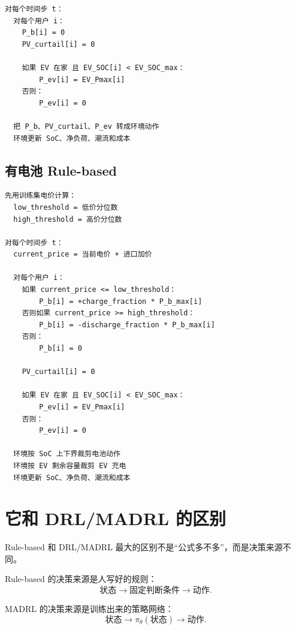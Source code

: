 \documentclass[UTF8,zihao=-4]{ctexart}
\begin{document}
\begin{lstlisting}[language={},caption={无电池 Rule-based 控制流程}]
对每个时间步 t：
  对每个用户 i：
    P_b[i] = 0
    PV_curtail[i] = 0

    如果 EV 在家 且 EV_SOC[i] < EV_SOC_max：
        P_ev[i] = EV_Pmax[i]
    否则：
        P_ev[i] = 0

  把 P_b、PV_curtail、P_ev 转成环境动作
  环境更新 SoC、净负荷、潮流和成本
\end{lstlisting}

\subsection{有电池 Rule-based}

\begin{lstlisting}[language={},caption={有电池 Rule-based 控制流程}]
先用训练集电价计算：
  low_threshold = 低价分位数
  high_threshold = 高价分位数

对每个时间步 t：
  current_price = 当前电价 + 进口加价

  对每个用户 i：
    如果 current_price <= low_threshold：
        P_b[i] = +charge_fraction * P_b_max[i]
    否则如果 current_price >= high_threshold：
        P_b[i] = -discharge_fraction * P_b_max[i]
    否则：
        P_b[i] = 0

    PV_curtail[i] = 0

    如果 EV 在家 且 EV_SOC[i] < EV_SOC_max：
        P_ev[i] = EV_Pmax[i]
    否则：
        P_ev[i] = 0

  环境按 SoC 上下界裁剪电池动作
  环境按 EV 剩余容量裁剪 EV 充电
  环境更新 SoC、净负荷、潮流和成本
\end{lstlisting}

\section{它和 DRL/MADRL 的区别}

Rule-based 和 DRL/MADRL 最大的区别不是“公式多不多”，而是决策来源不同。

Rule-based 的决策来源是人写好的规则：
\begin{equation}
\text{状态}\longrightarrow\text{固定判断条件}\longrightarrow\text{动作}.
\end{equation}

MADRL 的决策来源是训练出来的策略网络：
\begin{equation}
\text{状态}\longrightarrow \pi_\theta(\text{状态})\longrightarrow\text{动作}.
\end{equation}
\end{document}
